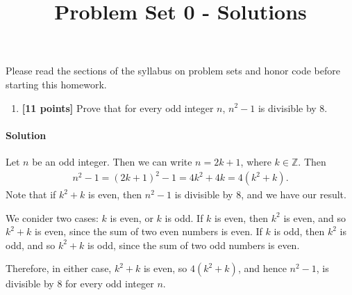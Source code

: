 \documentclass[11pt]{article}
\title{Problem Set 0 - Solutions}
\author{}
\date{}
\begin{document}
\maketitle

Please read the sections of the syllabus on problem sets and honor code before starting this homework.


\begin{enumerate}
\item  \textbf{[11 points]} Prove that for every odd integer $n$, $n^2-1$ is divisible by 8. 

\end{enumerate}

{\paragraph{Solution} Let $n$ be an odd integer. Then we can write $n=2k+1$, where $k\in \mathbb{Z}.$ Then
\begin{align}
n^2-1=(2k+1)^2-1=4k^2+4k=4(k^2+k).
\end{align}
Note that if $k^2+k$ is even, then $n^2-1$ is divisible by $8$, and we have our result.

We conider two cases: $k$ is even, or $k$ is odd. If $k$ is even, then $k^2$ is even, and so $k^2+k$ is even, since the sum of two even numbers is even. If $k$ is odd, then $k^2$ is odd, and so $k^2+k$ is odd, since the sum of two odd numbers is even.

Therefore, in either case, $k^2+k$ is even, so $4(k^2+k)$, and hence $n^2-1$, is divisible by $8$ for every odd integer $n$.}
\end{document}
